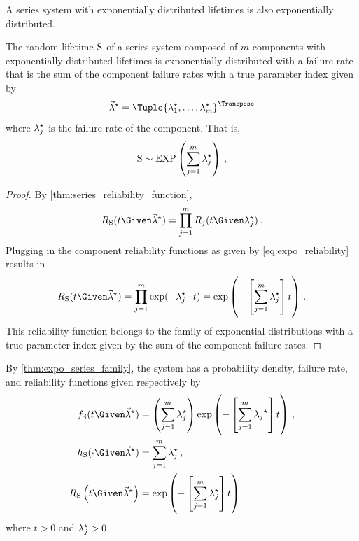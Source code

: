 \documentclass[../main.tex]{subfiles}
\begin{document}
A series system with exponentially distributed lifetimes is also 
exponentially distributed.
\begin{theorem}
\label{thm:expo_series_family}
The random lifetime $\mathrm{S}$ of a series system composed of $m$ components with 
exponentially distributed lifetimes is exponentially distributed with a failure 
rate that is the sum of the component failure rates with a true parameter index 
given by
\begin{equation}
    \tparam{\vec\lambda} = \Tuple{\tparam\lambda_1, \ldots, 
    \tparam\lambda_m}^{\Transpose}
\end{equation}
where ${\lambda}^{\star}_j$ is the failure rate of the \jth component. That is,
\begin{equation}
    \mathrm{S} \sim \mathrm{EXP} \left(\sum_{j=1}^{m} {\lambda}^{\star}_j\right)\,,
\end{equation}

\end{theorem}
\begin{proof}
By \cref{thm:series_reliability_function},
\begin{equation}
    \srv_{\sv}(t \Given \tparam{\vec\lambda}) = \prod_{j=1}^{m} \srv_j(t \Given 
    \tparam\lambda_j)\,.
\end{equation}
Plugging in the component reliability functions as given by 
\cref{eq:expo_reliability} results in
\begin{equation}
    \srv_{\sv}(t \Given \tparam{\vec\lambda}) = \prod_{j=1}^{m} 
    \exp(-\tparam\lambda_j \cdot t) =
    \exp \left(-\left [ \sum_{j=1}^{m}{\tparam\lambda_j} \right ] t\right)\,.
\end{equation}
This reliability function belongs to the family of exponential 
distributions with a true parameter index given by the sum of the component 
failure rates.
\end{proof}

By \cref{thm:expo_series_family}, the system has a probability density, 
failure rate, and reliability functions given respectively by
\begin{align}
\label{eq:expo_sys_pdf}
\spdf(t \Given \tparam{\vec\lambda}) &=
    \left ( \sum_{j=1}^{m} {\tparam{\lambda}_j} \right ) \exp
    \left(-\left [ \sum_{j=1}^{m}{\tparam{\lambda_j}} \right ] t\right)\,,\\
\label{eq:expo_sys_failure_rate}
\haz_{\sv}(\cdot \Given \tparam{\vec\lambda}) &=
    \sum_{j=1}^{m}{\tparam\lambda_j}\,,\\
\label{eq:sys_expo_reliability_function}
\srv_{\sv} \left(t \Given \tparam{\vec\lambda} \right) &=
    \exp \left(-\left [ \sum_{j=1}^{m}{\tparam\lambda_j} \right ] t\right)
\end{align}
where $t > 0$ and ${\lambda}^{\star}_j > 0$.
\end{document}
